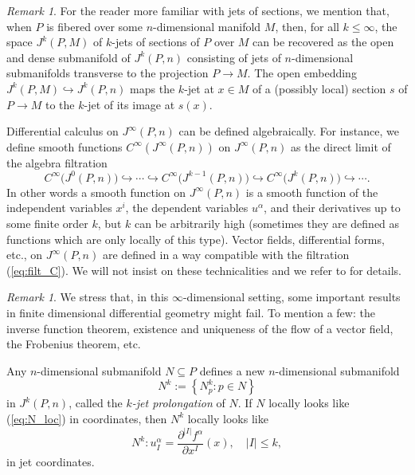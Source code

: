 \documentclass{conm-p-l}
\theoremstyle{definition}
\theoremstyle{remark}
\newtheorem{remark}[theorem]{Remark}
\numberwithin{equation}{section}
\begin{document}
 
\begin{remark}
For the reader more familiar with jets of sections, we mention that, when $P$ is fibered over some $n$-dimensional manifold $M$, then, for all $k \leq \infty$, the space $J^k (P, M)$ of $k$-jets of sections of $P$ over $M$ can be recovered as the open and dense submanifold of $J^k (P, n)$ consisting of jets of $n$-dimensional submanifolds transverse to the projection $P \to M$. The open embedding $J^k (P, M) \hookrightarrow J^k (P, n)$ maps the $k$-jet at $x \in M$ of a (possibly local) section $s$ of $P \to M$ to the $k$-jet of its image at $s(x)$.
\end{remark}
  


Differential calculus on $J^\infty (P, n)$ can be defined algebraically. For instance, we define smooth functions $C^\infty (J^\infty (P, n))$ on $J^\infty (P,n)$ as the direct limit of the algebra filtration
\begin{equation}\label{eq:filt_C}
C^\infty \big(J^0 (P, n)\big) \hookrightarrow \cdots \hookrightarrow C^\infty \big(J^{k-1} (P, n)\big) \hookrightarrow C^\infty \big(J^k (P, n)\big) \hookrightarrow \cdots.
\end{equation}
In other words a smooth function on $J^\infty (P, n)$ is a smooth function of the independent variables $x^i$, the dependent variables $u^\alpha$, and their derivatives up to some finite order $k$, but $k$ can be arbitrarily high (sometimes they are defined as functions which are only locally of this type). Vector fields, differential forms, etc., on $J^\infty (P, n)$ are defined in a way compatible with the filtration (\ref{eq:filt_C}). We will not insist on these technicalities and we refer to \cite{b...99} for details.

\begin{remark}\label{rem:infty_dim}
We stress that, in this $\infty$-dimensional setting, some important results in finite dimensional differential geometry might fail. To mention a few: the inverse function theorem, existence and uniqueness of the flow of a vector field, the Frobenius theorem, etc.
\end{remark}

Any $n$-dimensional submanifold $N \subseteq P$ defines a new $n$-dimensional submanifold
\[
N^k :=\left\{ N^k_p : p \in N \right\}
\]
in $J^k (P, n)$, called the \emph{$k$-jet prolongation} of $N$. If $N$ locally looks like (\ref{eq:N_loc}) in coordinates, then $N^k$ locally looks like
\[
N^k :  u^\alpha_I = \frac{\partial^{|I|} f^\alpha}{\partial x^I} (x), \quad |I| \leq k,
\]
in jet coordinates.
\end{document}
